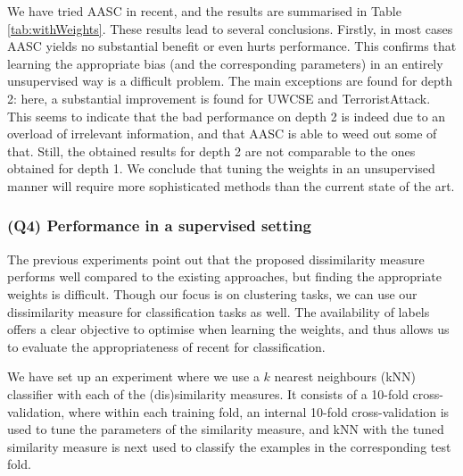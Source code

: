We have tried AASC in \gls{recent}, and the results  are summarised in Table~ \ref{tab:withWeights}.
These results lead to several conclusions.
Firstly, in most cases AASC yields no substantial benefit or even hurts performance.
This confirms that learning the appropriate bias (and the corresponding parameters) in an entirely unsupervised way is a difficult problem.
The main exceptions are found for depth 2: here, a substantial improvement is found for UWCSE and TerroristAttack.
This seems to indicate that the bad performance on depth 2 is indeed due to an overload of irrelevant information, and that AASC is able to weed out some of that.
Still, the obtained results for depth 2 are not comparable to the ones obtained for depth 1.
We conclude that tuning the weights in an unsupervised manner will require more sophisticated methods than the current state of the art.









\subsubsection{\textbf{(Q4) Performance in a supervised setting}}


The previous experiments point out that the proposed dissimilarity measure performs well compared to the existing approaches, but finding the appropriate weights is difficult.
Though our focus is on clustering tasks, we can use our dissimilarity measure for classification tasks as well.
The availability of labels offers a clear objective to optimise when learning the weights, and thus allows us to evaluate the appropriateness of \gls{recent} for classification.

We have set up an experiment where we use a $k$ nearest neighbours (kNN) classifier with each of the (dis)similarity measures.
It consists of a 10-fold cross-validation, where within
each training fold, an internal 10-fold cross-validation is used to tune the parameters of the similarity measure, and kNN with the tuned similarity measure is next used to classify the examples in the corresponding test fold.



